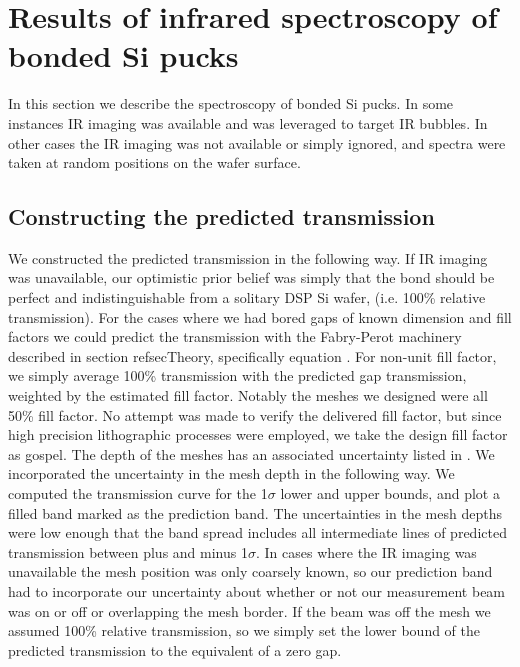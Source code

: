\documentclass[osajnl,preprint,showpacs,superscriptaddress,12pt]{revtex4-1} %
\begin{document}
\section{Results of infrared spectroscopy of bonded Si pucks}
In this section we describe the spectroscopy of bonded Si pucks.  In some instances IR imaging was available and was leveraged to target IR bubbles.  In other cases the IR imaging was not available or simply ignored, and spectra were taken at random positions on the wafer surface.  

\subsection{Constructing the predicted transmission}
We constructed the predicted transmission in the following way.  If IR imaging was unavailable, our optimistic prior belief was simply that the bond should be perfect and indistinguishable from a solitary DSP Si wafer, (i.e. 100\% relative transmission).  For the cases where we had bored gaps of known dimension and fill factors we could predict the transmission with the Fabry-Perot machinery described in section ref{secTheory}, specifically equation \label{eqFP}.  For non-unit fill factor, we simply average 100\% transmission with the predicted gap transmission, weighted by the estimated fill factor.  Notably the meshes we designed were all 50\% fill factor.  No attempt was made to verify the delivered fill factor, but since high precision lithographic processes were employed, we take the design fill factor as gospel.  The depth of the meshes has an associated uncertainty listed in \label{tabbondexper}.  We incorporated the uncertainty in the mesh depth in the following way.  We computed the transmission curve for the 1$\sigma$ lower and upper bounds, and plot a filled band marked as the prediction band.  The uncertainties in the mesh depths were low enough that the band spread includes all intermediate lines of predicted transmission between plus and minus 1$\sigma$.  In cases where the IR imaging was unavailable the mesh position was only coarsely known, so our prediction band had to incorporate our uncertainty about whether or not our measurement beam was on or off or overlapping the mesh border.  If the beam was off the mesh we assumed 100\% relative transmission, so we simply set the lower bound of the predicted transmission to the equivalent of a zero gap.  
\end{document}
